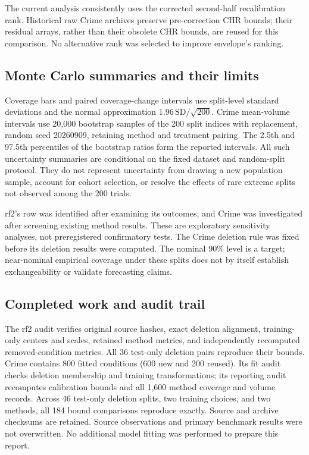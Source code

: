 \documentclass[11pt,letterpaper]{article}
\begin{document}
The current analysis consistently uses the corrected second-half recalibration
rank. Historical raw Crime archives preserve pre-correction CHR bounds; their
residual arrays, rather than their obsolete CHR bounds, are reused for this
comparison. No alternative rank was selected to improve envelope's ranking.

\subsection{Monte Carlo summaries and their limits}
Coverage bars and paired coverage-change intervals use split-level standard
deviations and the normal approximation $1.96\,\mathrm{SD}/\sqrt{200}$.
Crime mean-volume intervals use 20,000 bootstrap samples of the 200 split
indices with replacement, random seed 20260909, retaining method and treatment
pairing. The 2.5th and 97.5th percentiles of the bootstrap ratios form the
reported intervals. All such uncertainty summaries are conditional on the
fixed dataset and random-split protocol. They do not represent uncertainty
from drawing a new population sample, account for cohort selection, or resolve
the effects of rare extreme splits not observed among the 200 trials.

rf2's row was identified after examining its outcomes, and Crime was investigated
after screening existing method results. These are exploratory sensitivity
analyses, not preregistered confirmatory tests. The Crime deletion rule was fixed
before its deletion results were computed. The nominal 90\% level is a target;
near-nominal empirical coverage under these splits does not by itself establish
exchangeability or validate forecasting claims.

\subsection{Completed work and audit trail}
The rf2 audit verifies original source hashes, exact deletion alignment,
training-only centers and scales, retained method metrics, and independently
recomputed removed-condition metrics. All 36 test-only deletion pairs reproduce
their bounds. Crime contains 800 fitted conditions (600 new and 200 reused).
Its fit audit checks deletion membership and training transformations; its
reporting audit recomputes calibration bounds and all 1,600 method coverage and
volume records. Across 46 test-only deletion splits, two training choices,
and two methods, all 184 bound comparisons reproduce exactly. Source and
archive checksums are retained. Source observations and primary benchmark
results were not overwritten. No additional model fitting was performed to
prepare this report.
\end{document}
